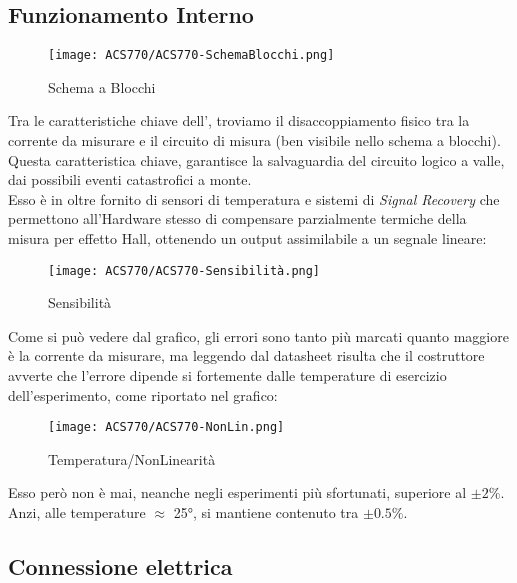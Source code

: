 \subsection{Funzionamento Interno}
\vspace{-5mm}
\begin{figure}[H]
	\centering
	\caption[ Schema a Blocchi]{Schema a Blocchi}
	\texttt{[image: ACS770/ACS770-SchemaBlocchi.png]}
\end{figure}
\noindent
Tra le caratteristiche chiave dell'\cite{ACS770}, troviamo il disaccoppiamento fisico tra la corrente da misurare e il circuito di misura (ben visibile nello schema a blocchi). Questa caratteristica chiave, garantisce la salvaguardia del circuito logico a valle, dai possibili eventi catastrofici a monte.\\
Esso è in oltre fornito di sensori di temperatura e sistemi di \textit{Signal Recovery} che permettono all'Hardware stesso di compensare parzialmente \nonLinearita termiche della misura per effetto Hall, ottenendo un output assimilabile a un segnale lineare:
\newpage
\begin{figure}[H]
	\centering
	\caption[ Sensibilità rispetto Temperatura]{Sensibilità}
	\texttt{[image: ACS770/ACS770-Sensibilità.png]}
\end{figure}
\vspace{-5mm}
\noindent
Come si può vedere dal grafico, gli errori sono tanto più marcati quanto maggiore è la corrente da misurare, ma leggendo dal datasheet risulta che il costruttore avverte che l'errore dipende si fortemente dalle temperature di esercizio dell'esperimento, come riportato nel grafico:\\\vspace{-12mm}
\begin{figure}[H]
	\centering
	\caption[ \nonLinearita]{Temperatura/NonLinearità}
	\vspace{1mm}
	\texttt{[image: ACS770/ACS770-NonLin.png]}
\end{figure}\vspace{-8mm}

\noindent
Esso però non è mai, neanche negli esperimenti più sfortunati, superiore al $\pm2\%$.\\
Anzi, alle temperature $\approx$ 25°, si mantiene contenuto tra $\pm0.5\%$.

\newpage

\subsection{Connessione elettrica}

